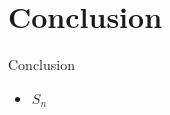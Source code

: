 
\section{Conclusion}

\begin{frame}{Conclusion}
    \large
    \begin{itemize}
        \item $S_n$
    \end{itemize}
    
\end{frame}
